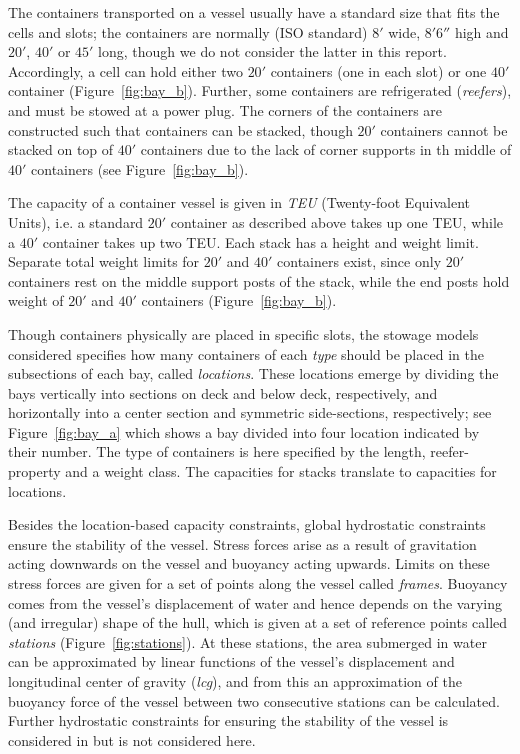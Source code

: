The containers transported on a vessel usually have a standard size that fits the cells and slots; the containers are normally (ISO standard) $8'$ wide, $8'6''$ high and $20'$,
$40'$ or $45'$ long, though we do not consider the latter in this report. Accordingly, a cell can hold either two $20'$ containers (one in each slot) or one $40'$ container (Figure~\ref{fig:bay_b}). Further, some containers are refrigerated (\emph{reefers}), and must be stowed at a power plug. 
The corners of the containers are constructed such that containers can be stacked, though $20'$ containers cannot
be stacked on top of $40'$ containers due to the lack of corner supports in th middle of $40'$ containers (see Figure~\ref{fig:bay_b}). 

The capacity of a container vessel is given in \emph{TEU} (Twenty-foot Equivalent Units), i.e. a standard $20'$ container as described above takes up one TEU, while a $40'$ container takes up two TEU. Each stack has a height and weight limit. Separate total weight limits for $20'$ and $40'$ containers exist, since only $20'$ containers rest on the middle support posts of the stack, while the end posts hold weight of $20'$ and $40'$ containers (Figure~\ref{fig:bay_b}). 

Though containers physically are placed in specific slots, the stowage models considered {specifies} how many containers of each \emph{type} should be placed in the subsections of each bay, called \emph{locations}. 
These locations emerge by dividing the bays {vertically} into sections on deck and below deck, respectively, and {horizontally} into a center section and symmetric side-sections, respectively; see Figure~\ref{fig:bay_a} which shows a bay divided into four location indicated by their number. The type of containers is here specified by the length, reefer-property and a weight class. The capacities for stacks translate to capacities for locations.

Besides the location-based capacity constraints, global hydrostatic constraints ensure the stability of the vessel. 
Stress forces arise as a result of gravitation acting downwards on the vessel and buoyancy acting upwards. Limits on these stress forces are given for a set of points along the vessel called \emph{frames}. %
Buoyancy comes from the vessel's displacement of water and hence depends on the varying (and irregular) shape of the hull, which is given at a set of reference points called \emph{stations} (Figure~\ref{fig:stations}). At these stations, the area submerged in water can be approximated by linear functions of the vessel's displacement and longitudinal center of gravity (\emph{lcg}), and from this an approximation of the buoyancy force of the vessel between two consecutive stations can be calculated. 
Further hydrostatic constraints for ensuring the stability of the vessel is considered in \cite{AlbertosThesis} but is not considered here.


